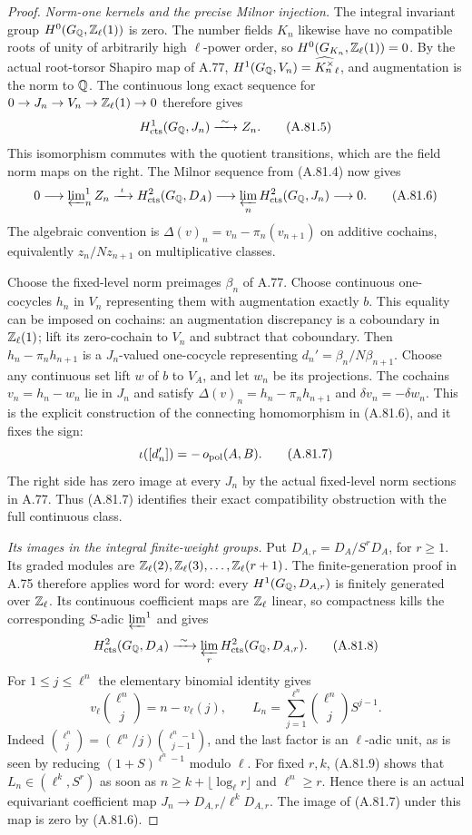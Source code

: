 \begin{proof}
\emph{Norm-one kernels and the precise Milnor injection.}
The integral invariant group
$H^0(G_\mathbb Q,\mathbb Z_\ell(1))$ is zero.
The number fields $K_n$ likewise have no compatible
roots of unity of arbitrarily high $\ell$-power order,
so $H^0(G_{K_n},\mathbb Z_\ell(1))=0$.
By the actual root-torsor Shapiro map of A.77,
$H^1(G_\mathbb Q,V_n)=\widehat{K_n^\times}_\ell$,
and augmentation is the norm to $\mathbb Q$.
The continuous long exact sequence for
$0\to J_n\to V_n\to\mathbb Z_\ell(1)\to0$
therefore gives
\[
 H^1_{\rm cts}(G_\mathbb Q,J_n)
       \xrightarrow{\ \sim\ }Z_n .
 \tag{A.81.5}
\]
This isomorphism commutes with the quotient transitions,
which are the field norm maps on the right.
The Milnor sequence from (A.81.4) now gives
\[
 0\longrightarrow\varprojlim\nolimits_n^1 Z_n
   \xrightarrow{\ \iota\ }
   H^2_{\rm cts}(G_\mathbb Q,D_A)
   \longrightarrow
   \varprojlim_n H^2_{\rm cts}(G_\mathbb Q,J_n)
   \longrightarrow0 .
 \tag{A.81.6}
\]
The algebraic convention is
$\Delta(v)_n=v_n-\pi_n(v_{n+1})$ on additive cochains,
equivalently $z_n/Nz_{n+1}$ on multiplicative classes.

Choose the fixed-level norm preimages $\beta_n$
of A.77.
Choose continuous one-cocycles $h_n$ in $V_n$
representing them with augmentation exactly $b$.
This equality can be imposed on cochains: an
augmentation discrepancy is a coboundary in
$\mathbb Z_\ell(1)$; lift its zero-cochain to $V_n$
and subtract that coboundary.
Then $h_n-\pi_nh_{n+1}$ is a $J_n$-valued
one-cocycle representing
$d_n'=\beta_n/N\beta_{n+1}$.
Choose any continuous set lift $w$ of $b$ to $V_A$,
and let $w_n$ be its projections.
The cochains $v_n=h_n-w_n$ lie in $J_n$ and satisfy
$\Delta(v)_n=h_n-\pi_nh_{n+1}$ and
$\delta v_n=-\delta w_n$.
This is the explicit construction of the connecting
homomorphism in (A.81.6), and it fixes the sign:
\[
                  \iota([d_n'])=-\,o_{\rm pol}(A,B).
 \tag{A.81.7}
\]
The right side has zero image at every $J_n$ by
the actual fixed-level norm sections in A.77.
Thus (A.81.7) identifies their exact compatibility
obstruction with the full continuous class.

\emph{Its images in the integral finite-weight groups.}
Put $D_{A,r}=D_A/S^rD_A$, for $r\geq1$.
Its graded modules are
$\mathbb Z_\ell(2),\mathbb Z_\ell(3),\ldots,\mathbb Z_\ell(r+1)$.
The finite-generation proof in A.75 therefore applies
word for word: every $H^1(G_\mathbb Q,D_{A,r})$ is finitely
generated over $\mathbb Z_\ell$.
Its continuous coefficient maps are $\mathbb Z_\ell$ linear,
so compactness kills the corresponding
$S$-adic $\varprojlim^1$ and gives
\[
 H^2_{\rm cts}(G_\mathbb Q,D_A)
       \xrightarrow{\ \sim\ }
       \varprojlim_r H^2_{\rm cts}(G_\mathbb Q,D_{A,r}).
 \tag{A.81.8}
\]
For $1\leq j\leq\ell^n$ the elementary binomial identity
gives
\[
 v_\ell\binom{\ell^n}{j}=n-v_\ell(j),\qquad
 L_n=\sum_{j=1}^{\ell^n}\binom{\ell^n}{j}S^{j-1}.
 \tag{A.81.9}
\]
Indeed
$\binom{\ell^n}{j}=(\ell^n/j)
\binom{\ell^n-1}{j-1}$, and the last factor is an
$\ell$-adic unit, as is seen by reducing
$(1+S)^{\ell^n-1}$ modulo $\ell$.
For fixed $r,k$, (A.81.9) shows that
$L_n\in(\ell^k,S^r)$ as soon as
$n\geq k+\lfloor\log_\ell r\rfloor$ and
$\ell^n\geq r$.
Hence there is an actual equivariant coefficient map
$J_n\to D_{A,r}/\ell^kD_{A,r}$.
The image of (A.81.7) under this map is zero by
(A.81.6).


\end{proof}
